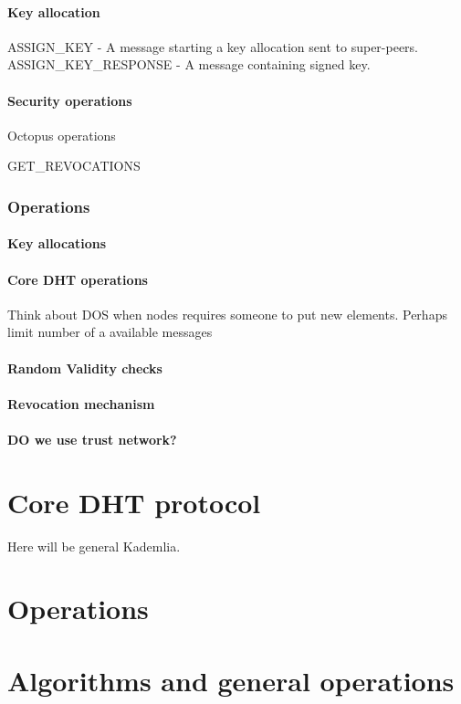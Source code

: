 \paragraph{Key allocation}

ASSIGN\_KEY - A message starting a key allocation sent to super-peers.
ASSIGN\_KEY\_RESPONSE - A message containing signed key.

\paragraph{Security operations}

Octopus operations

GET\_REVOCATIONS

\subsubsection{Operations}
\paragraph{Key allocations}
\paragraph{Core DHT operations}
Think about DOS when nodes requires someone to put new elements. Perhaps limit
number of a available messages 
\paragraph{Random Validity checks}
\paragraph{Revocation mechanism}
\paragraph{DO we use trust network?}

\section{Core DHT protocol}

Here will be general Kademlia.

\section{Operations}

\section{Algorithms and general operations}

